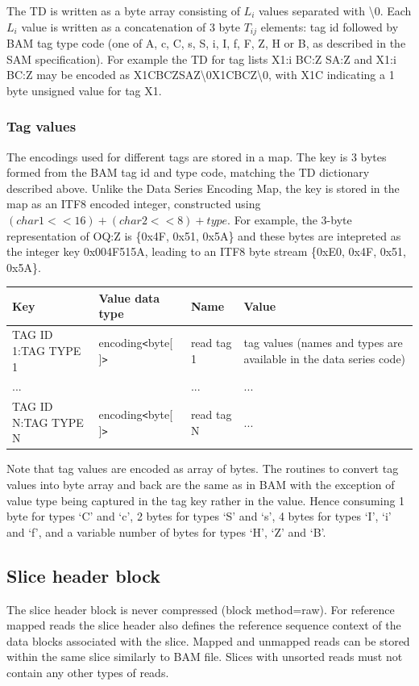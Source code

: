 \documentclass[a4paper]{article}
\begin{document}
The TD is written as a byte array consisting of $L_{i}$ values separated with \textbackslash{}0.
Each $L_{i}$ value is written as a concatenation of 3 byte $T_{ij}$ elements: tag id followed by BAM tag type code (one of A, c, C, s, S, i, I, f, F, Z, H or B, as described in the SAM specification).
For example the TD for tag lists X1:i BC:Z SA:Z and X1:i BC:Z may be encoded as X1CBCZSAZ\textbackslash{}0X1CBCZ\textbackslash{}0, with X1C indicating a 1 byte unsigned value for tag X1.

\subsubsection*{Tag values}

The encodings used for different tags are stored in a map.
The key is 3 bytes formed from the BAM tag id and type code, matching the TD dictionary described above.
Unlike the Data Series Encoding Map, the key is stored in the map as an ITF8 encoded integer, constructed using $(char1<<16) + (char2<<8) + type$.
For example, the 3-byte representation of OQ:Z is \{0x4F, 0x51, 0x5A\} and these bytes are intepreted as the integer key 0x004F515A, leading to an ITF8 byte stream \{0xE0, 0x4F, 0x51, 0x5A\}.

\begin{tabular}{|l|l|l|>{\raggedright}p{160pt}|}
\hline
\textbf{Key} & \textbf{Value data type} & \textbf{Name} & \textbf{Value}
\tabularnewline
\hline
TAG ID 1:TAG TYPE 1 & encoding\texttt{<}byte[ ]\texttt{>} & read tag 1 & tag values
(names and types are available in the data series code)\tabularnewline
\hline
... &  & ... & ...\tabularnewline
\hline
TAG ID N:TAG TYPE N & encoding\texttt{<}byte[ ]\texttt{>} & read tag N & ...\tabularnewline
\hline
\end{tabular}

Note that tag values are encoded as array of bytes. The routines to convert tag 
values into byte array and back are the same as in BAM with the exception of value 
type being captured in the tag key rather in the value.
Hence consuming 1 byte for types `C' and `c', 2 bytes for types `S' and `s', 4 bytes for types `I', `i' and `f', and a variable number of bytes for types `H', `Z' and `B'.

\subsection{\textbf{Slice header block}}

The slice header block is never compressed (block method=raw). For reference mapped 
reads the slice header also defines the reference sequence context of the data 
blocks associated with the slice. Mapped and unmapped reads can be stored within 
the same slice similarly to BAM file. Slices with unsorted reads must not contain 
any other types of reads.
\end{document}
